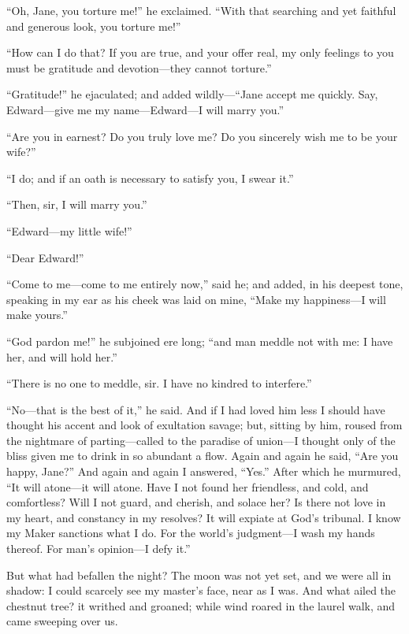 \enquote{Oh, Jane, you torture me!} he exclaimed. \enquote{With that
	searching and yet faithful and generous look, you torture me!}

\enquote{How can I do that? If you are true, and your offer real, my
	only feelings to you must be gratitude and devotion---they cannot
	torture.}

\enquote{Gratitude!} he ejaculated; and added wildly---\enquote{Jane
	accept me quickly. Say, Edward---give me my name---Edward---I will
	marry you.}

\enquote{Are you in earnest? Do you truly love me? Do you sincerely
	wish me to be your wife?}

\enquote{I do; and if an oath is necessary to satisfy you, I swear it.}

\enquote{Then, sir, I will marry you.}

\enquote{Edward---my little wife!}

\enquote{Dear Edward!}

\enquote{Come to me---come to me entirely now,} said he; and added, in
his deepest tone, speaking in my ear as his cheek was laid on mine,
\enquote{Make my happiness---I will make yours.}

\enquote{God pardon me!} he subjoined ere long; \enquote{and man meddle
	not with me: I have her, and will hold her.}

\enquote{There is no one to meddle, sir. I have no kindred to
	interfere.}

\enquote{No---that is the best of it,} he said. And if I had loved him
less I should have thought his accent and look of exultation savage;
but, sitting by him, roused from the nightmare of parting---called to
the paradise of union---I thought only of the bliss given me to drink in
so abundant a flow. Again and again he said, \enquote{Are you happy,
	Jane?} And again and again I answered, \enquote{Yes.} After which he
murmured, \enquote{It will atone---it will atone. Have I not found her
	friendless, and cold, and comfortless? Will I not guard, and cherish,
	and solace her? Is there not love in my heart, and constancy in my
	resolves? It will expiate at God's tribunal. I know my Maker sanctions
	what I do. For the world's judgment---I wash my hands thereof. For
	man's opinion---I defy it.}

But what had befallen the night? The moon was not yet set, and we were
all in shadow: I could scarcely see my master's face, near as I was.
And what ailed the chestnut tree? it writhed and groaned; while wind
roared in the laurel walk, and came sweeping over us.

